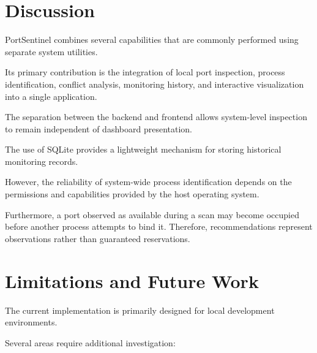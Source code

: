 \documentclass[conference]{IEEEtran}
\begin{document}
\section{Discussion}

PortSentinel combines several capabilities that
are commonly performed using separate system
utilities.

Its primary contribution is the integration of
local port inspection, process identification,
conflict analysis, monitoring history, and
interactive visualization into a single application.

The separation between the backend and frontend
allows system-level inspection to remain independent
of dashboard presentation.

The use of SQLite provides a lightweight mechanism
for storing historical monitoring records.

However, the reliability of system-wide process
identification depends on the permissions and
capabilities provided by the host operating system.

Furthermore, a port observed as available during
a scan may become occupied before another process
attempts to bind it. Therefore, recommendations
represent observations rather than guaranteed
reservations.

\section{Limitations and Future Work}

The current implementation is primarily designed
for local development environments.

Several areas require additional investigation:
\end{document}
